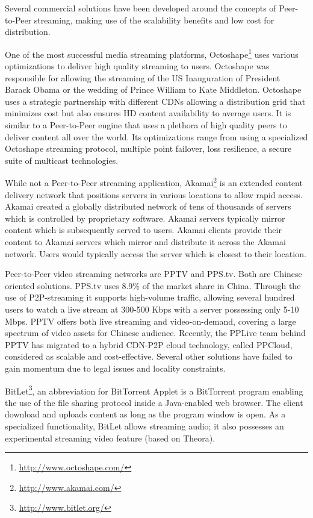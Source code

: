 Several commercial solutions have been developed around the concepts of
Peer-to-Peer streaming, making use of the scalability benefits and low cost
for distribution.

One of the most successful media streaming platforms,
Octoshape\footnote{\url{http://www.octoshape.com/}} uses various optimizations to
deliver high quality streaming to users.  Octoshape was responsible for
allowing the streaming of the US Inauguration of President Barack Obama or the
wedding of Prince William to Kate Middleton.  Octoshape uses a strategic
partnership with different CDNs allowing a distribution grid that minimizes
cost but also ensures HD content availability to average users. It is similar to
a Peer-to-Peer engine that uses a plethora of high quality peers to deliver
content all over the world. Its optimizations range from using a specialized
Octoshape streaming protocol, multiple point failover, loss resilience, a
secure suite of multicast technologies.

While not a Peer-to-Peer streaming application,
Akamai\footnote{\url{http://www.akamai.com/}} is an extended content delivery
network that positions servers in various locations to allow rapid access.
Akamai created a globally distributed network of tens of thousands of servers
which is controlled by proprietary software. Akamai servers typically mirror
content which is subsequently served to users. Akamai clients provide their
content to Akamai servers which mirror and distribute it across the Akamai
network. Users would typically access the server which is closest to their
location.

Peer-to-Peer video streaming networks are PPTV and PPS.tv. Both are Chinese
oriented solutions. PPS.tv uses 8.9\% of the market share in China. Through
the use of P2P-streaming it supports high-volume traffic, allowing several
hundred users to watch a live stream at 300-500 Kbps with a server possessing
only 5-10 Mbps. PPTV offers both live streaming and video-on-demand, covering
a large spectrum of video assets for Chinese audience. Recently, the PPLive
team behind PPTV has migrated to a hybrid CDN-P2P cloud technology, called
PPCloud, considered as scalable and cost-effective. Several other solutions
have failed to gain momentum due to legal issues and locality constraints.

BitLet\footnote{\url{http://www.bitlet.org/}}, an abbreviation for BitTorrent Applet
is a BitTorrent program enabling the use of the file sharing protocol inside a
Java-enabled web browser. The client download and uploads content as long as
the program window is open. As a specialized functionality, BitLet allows
streaming audio; it also possesses an experimental streaming video feature
(based on Theora).

